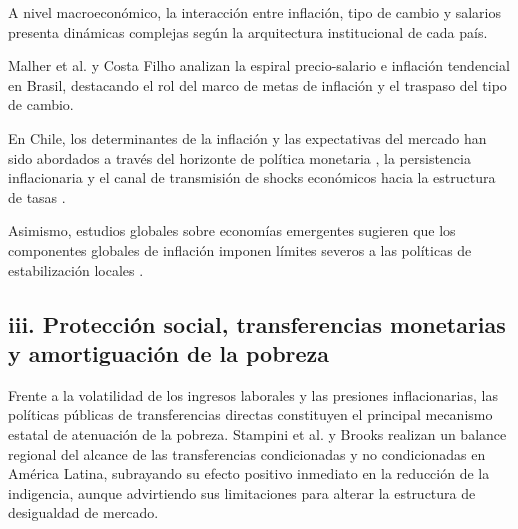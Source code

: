 A nivel macroeconómico, la interacción entre inflación, tipo de cambio y salarios presenta dinámicas complejas según la arquitectura institucional de cada país.

Malher et al. \parencite*{Malheretal2026} y Costa Filho \parencite*{CostaFilho2023} analizan la espiral precio-salario e inflación tendencial en Brasil, destacando el rol del marco de metas de inflación y el traspaso del tipo de cambio. 

En Chile, los determinantes de la inflación y las expectativas del mercado han sido abordados a través del horizonte de política monetaria \parencite{Gredigetal2008}, la persistencia inflacionaria \parencite{Pincheira2008, Medel2025} y el canal de transmisión de shocks económicos hacia la estructura de tasas \parencite{CabellosSanhueza2016, Al-HelalUddinAkram2025}. 

Asimismo, estudios globales sobre economías emergentes sugieren que los componentes globales de inflación imponen límites severos a las políticas de estabilización locales \parencite{Geoetal2024, CakirEkrem2025, Yilmazkuday2025}.

\subsection{iii. Protección social, transferencias monetarias y amortiguación de la pobreza}

Frente a la volatilidad de los ingresos laborales y las presiones inflacionarias, las políticas públicas de transferencias directas constituyen el principal mecanismo estatal de atenuación de la pobreza. Stampini et al. \parencite*{Stampinietal2025} y Brooks \parencite*{Brooks2015} realizan un balance regional del alcance de las transferencias condicionadas y no condicionadas en América Latina, subrayando su efecto positivo inmediato en la reducción de la indigencia, aunque advirtiendo sus limitaciones para alterar la estructura de desigualdad de mercado.

